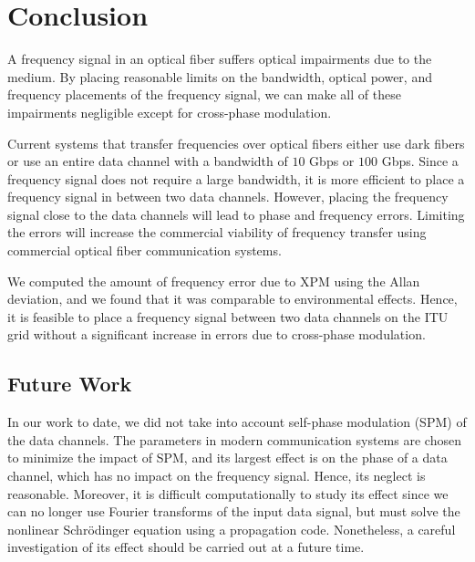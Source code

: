 \chapter{Conclusion}

A frequency signal in an optical fiber suffers optical impairments due to the medium. By placing reasonable limits on the bandwidth, optical power, and frequency placements of the frequency signal, we can make all of these impairments negligible except for cross-phase modulation.

Current systems that transfer frequencies over optical fibers either use dark fibers or use an entire data channel with a bandwidth of $10$ Gbps or $100$ Gbps. Since a frequency signal does not require a large bandwidth, it is more efficient to place a frequency signal in between two data channels. However, placing the frequency signal close to the data channels will 
lead to phase and frequency errors. Limiting the errors will increase the commercial viability of frequency transfer using commercial optical fiber communication systems.

We computed the amount of frequency error due to XPM using the Allan deviation, and we found that it was comparable to environmental effects. Hence, it is feasible to place a frequency signal between two data channels on the ITU grid without a significant increase in errors due to cross-phase modulation.

\section{Future Work}

In our work to date, we did not take into account self-phase modulation (SPM) of the data channels. The parameters in modern communication systems are chosen to minimize the impact of SPM, and its largest effect is on the phase of a data channel, which has no impact on the frequency signal. Hence, its neglect is reasonable. Moreover, it is difficult computationally to study its effect since we can no longer use Fourier transforms of the input data signal, but must solve the nonlinear Schr{\"o}dinger equation using a propagation code. Nonetheless, a careful investigation of its effect should be carried out at a future time.